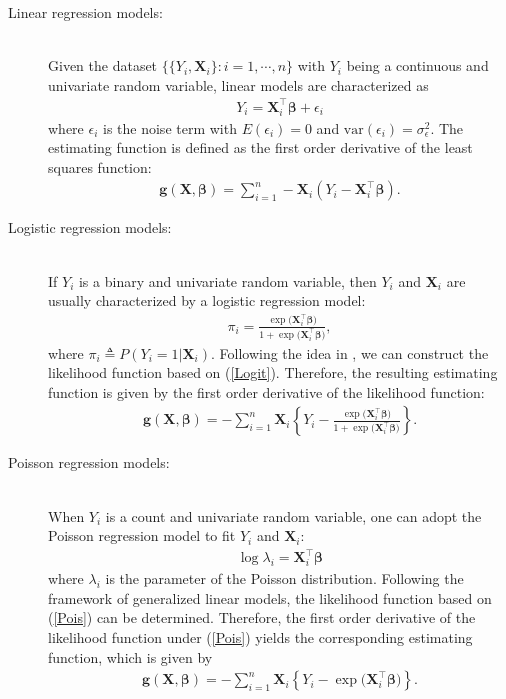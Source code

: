 \begin{description}

\item[Linear regression models:]
\ \\
Given the dataset $\big\{ \{Y_i, \mathbf{X}_i\} : i=1,\cdots,n\big\}$ with $Y_i$ being a continuous and univariate random variable, linear models are characterized as
\begin{eqnarray} \label{LM}
Y_i = \mathbf{X}_i^\top \boldsymbol{\beta} + \epsilon_i
\end{eqnarray}
where $\epsilon_i$ is the noise term with $E(\epsilon_i)=0$ and $\text{var}(\epsilon_i)=\sigma_\epsilon^2$. The estimating function is defined as the first order derivative of the least squares function:
\begin{eqnarray} \label{LM-g}
\mathbf{g}(\mathbf{X},\boldsymbol{\beta}) = \sum \limits_{i=1}^n -\mathbf{X}_i ( Y_i - \mathbf{X}_i^\top \boldsymbol{\beta}).
\end{eqnarray}


\item[Logistic regression models:]
\ \\
If $Y_i$ is a binary and univariate random variable, then $Y_i$ and $\mathbf{X}_i$ are usually characterized by a logistic regression model:
\begin{eqnarray} \label{Logit}
\pi_i = \frac{\exp\big(\mathbf{X}_i^\top \boldsymbol{\beta}\big)}{1+\exp\big(\mathbf{X}_i^\top \boldsymbol{\beta}\big)},
\end{eqnarray}
where $\pi_i \triangleq P(Y_i=1 | \mathbf{X}_i)$. Following the idea in \cite{Agresti:2012}, we can construct the likelihood function based on (\ref{Logit}). Therefore, the resulting estimating function is given by the first order derivative of the likelihood function:
\begin{eqnarray} \label{Logit-g}
\mathbf{g}(\mathbf{X},\boldsymbol{\beta}) = - \sum \limits_{i=1}^n \mathbf{X}_i \left\{ Y_i - \frac{\exp\big(\mathbf{X}_i^\top \boldsymbol{\beta}\big)}{1+\exp\big(\mathbf{X}_i^\top \boldsymbol{\beta}\big)} \right\}. \end{eqnarray}

\item[Poisson regression models:]
\ \\
When $Y_i$ is a count and univariate random variable, one can adopt the Poisson regression model to fit $Y_i$ and $\mathbf{X}_i$:
\begin{eqnarray} \label{Pois}
\log \lambda_i = \mathbf{X}_i^\top \boldsymbol{\beta} 
\end{eqnarray}
where $\lambda_i$ is the parameter of the Poisson distribution. Following the framework of generalized linear models, the likelihood function based on (\ref{Pois}) can be determined. Therefore, the first order derivative of the likelihood function under (\ref{Pois}) yields the corresponding estimating function, which is given by
\begin{eqnarray} \label{Pois-g}
\mathbf{g}(\mathbf{X},\boldsymbol{\beta}) = - \sum \limits_{i=1}^n \mathbf{X}_i \left\{ Y_i - \exp\big(\mathbf{X}_i^\top \boldsymbol{\beta}\big) \right\}.
\end{eqnarray}


\end{description}

